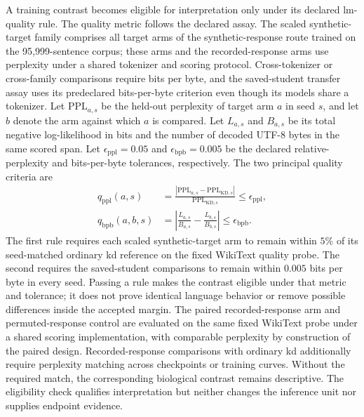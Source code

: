 A training contrast becomes eligible for interpretation only under its declared \ac{lm}-quality rule.
The quality metric follows the declared assay.
The scaled synthetic-target family comprises all target arms of the synthetic-response route trained on the 95,999-sentence corpus; these arms and the recorded-response arms use perplexity under a shared tokenizer and scoring protocol.
Cross-tokenizer or cross-family comparisons require bits per byte, and the saved-student transfer assay uses its predeclared bits-per-byte criterion even though its models share a tokenizer.
Let \(\mathrm{PPL}_{a,s}\) be the held-out perplexity of target arm \(a\) in seed \(s\), and let \(b\) denote the arm against which \(a\) is compared.
Let \(L_{a,s}\) and \(B_{a,s}\) be its total negative log-likelihood in bits and the number of decoded UTF-8 bytes in the same scored span.
Let \(\epsilon_{\mathrm{ppl}}=0.05\) and \(\epsilon_{\mathrm{bpb}}=0.005\) be the declared relative-perplexity and bits-per-byte tolerances, respectively.
The two principal quality criteria are
\begin{equation}
\begin{aligned}
q_{\mathrm{ppl}}(a,s)
&=
\frac{
\left|
\mathrm{PPL}_{a,s}
-
\mathrm{PPL}_{\mathrm{KD},s}
\right|
}{
\mathrm{PPL}_{\mathrm{KD},s}
}
\leq \epsilon_{\mathrm{ppl}},
\\
q_{\mathrm{bpb}}(a,b,s)
&=
\left|
\frac{L_{a,s}}{B_{a,s}}
-
\frac{L_{b,s}}{B_{b,s}}
\right|
\leq \epsilon_{\mathrm{bpb}}.
\end{aligned}
\label{eq:quality-eligibility}
\end{equation}
The first rule requires each scaled synthetic-target arm to remain within \(5\%\) of its seed-matched ordinary \ac{kd} reference on the fixed WikiText quality probe.
The second requires the saved-student comparisons to remain within \(0.005\) bits per byte in every seed.
Passing a rule makes the contrast eligible under that metric and tolerance; it does not prove identical language behavior or remove possible differences inside the accepted margin.
The paired recorded-response arm and permuted-response control are evaluated on the same fixed WikiText probe under a shared scoring implementation, with comparable perplexity by construction of the paired design.
Recorded-response comparisons with ordinary \ac{kd} additionally require perplexity matching across checkpoints or training curves.
Without the required match, the corresponding biological contrast remains descriptive.
The eligibility check qualifies interpretation but neither changes the inference unit nor supplies endpoint evidence.

